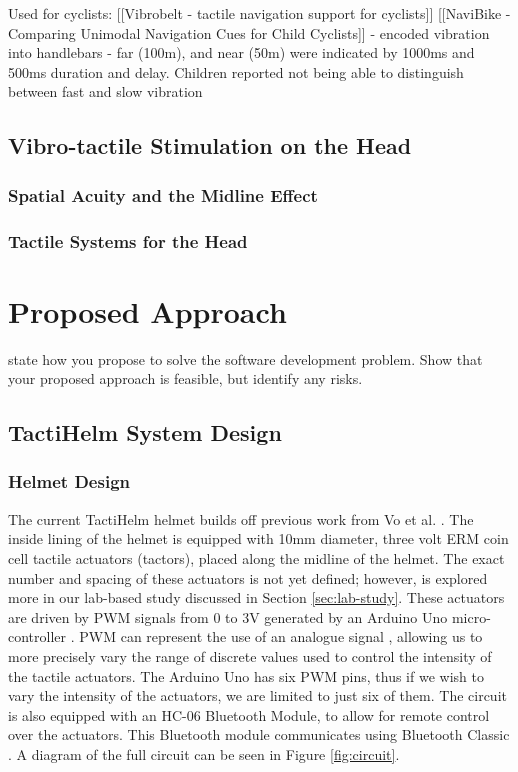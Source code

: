 \documentclass{interim}
\begin{document}
Used for cyclists:
[[Vibrobelt - tactile navigation support for cyclists]]
[[NaviBike - Comparing Unimodal Navigation Cues for Child Cyclists]] - encoded vibration into handlebars - far (100m), and near (50m) were indicated by 1000ms and 500ms duration and delay. Children reported not being able to distinguish between fast and slow vibration


\subsection{Vibro-tactile Stimulation on the Head}
\subsubsection{Spatial Acuity and the Midline Effect}

\subsubsection{Tactile Systems for the Head}


\section{Proposed Approach}

state how you propose to solve the software development problem. Show that your proposed approach is feasible, but identify any risks.

\subsection{TactiHelm System Design}
\subsubsection{Helmet Design}\label{sec:helmet-design}
The current TactiHelm helmet builds off previous work from Vo et al. \cite{10.1145/3411763.3451580}. The inside lining of the helmet is equipped with 10mm diameter, three volt ERM coin cell tactile actuators (tactors), placed along the midline of the helmet. The exact number and spacing of these actuators is not yet defined; however, is explored more in our lab-based study discussed in Section \ref{sec:lab-study}. These actuators are driven by PWM signals from 0 to 3V generated by an Arduino Uno micro-controller \cite{arduinouno}. PWM can represent the use of an analogue signal \cite{kart2001pulse}, allowing us to more precisely vary the range of discrete values used to control the intensity of the tactile actuators. The Arduino Uno has six PWM pins, thus if we wish to vary the intensity of the actuators, we are limited to just six of them. The circuit is also equipped with an HC-06 Bluetooth Module, to allow for remote control over the actuators. This Bluetooth module communicates using Bluetooth Classic \cite{hc06}. A diagram of the full circuit can be seen in Figure \ref{fig:circuit}.
\end{document}
